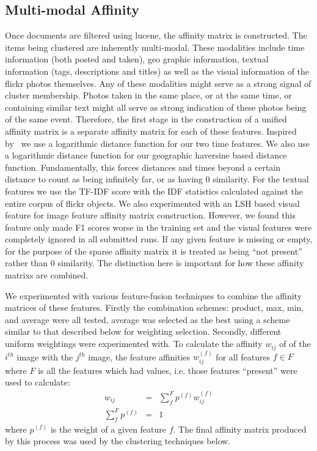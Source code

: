 \documentclass{../acm_proc_article-me11_tweaked}
\begin{document}
\subsection{Multi-modal Affinity} %
\label{ssub:multi_modal_affinity}
Once documents are filtered using lucene, the affinity matrix is constructed. The items being clustered are inherently multi-modal. These modalities include time information (both posted and taken), geo graphic information, textual information (tags, descriptions and titles) as well as the visual information of the flickr photos themselves. Any of these modalities might serve as a strong signal of cluster membership. Photos taken in the same place, or at the same time, or containing similar text might all serve as strong indication of these photos being of the same event. Therefore, the first stage in the construction of a unified affinity matrix is a separate affinity matrix for each of these features. Inspired by~\citet{Reuter2012ECS23247962324824} we use a logarithmic distance function for our two time features. We also use a logarithmic distance function for our geographic haversine based distance function. Fundamentally, this forces distances and times beyond a certain distance to count as being infinitely far, or as having 0 similarity. For the textual features we use the TF-IDF score with the IDF statistics calculated against the entire corpus of flickr objects. We also experimented with an LSH based visual feature for image feature affinity matrix construction. However, we found this feature only made F1 scores worse in the training set and the visual features were completely ignored in all submitted runs. If any given feature is missing or empty, for the purpose of the sparse affinity matrix it is treated as being ``not present'' rather than 0 similarity. The distinction here is important for how these affinity matrixs are combined.

We experimented with various feature-fusion techniques to combine the affinity matrices of these features. Firstly the combination schemes: product, max, min, and average were all tested, average was selected as the best using a scheme similar to that described below for weighting selection. Secondly, different uniform weightings were experimented with. To calculate the affinity  $w_{ij}$ of of the $i^{th}$ image with the $j^{th}$ image, the feature affinities $w_{ij}^{(f)}$ for all features $f\in F$ where $F$ is all the features which had values, i.e. those features ``present'' were used to calculate:
\begin{eqnarray}
 w_{ij} &=& \sum\limits_{f}^F p^{(f)} w_{ij}^{(f)}\\
 \sum\limits_{f}^F p^{(f)} &=& 1
\end{eqnarray}
where $p^{(f)}$ is the weight of a given feature $f$. The final affinity matrix produced by this process was used by the clustering techniques below.
\end{document}
